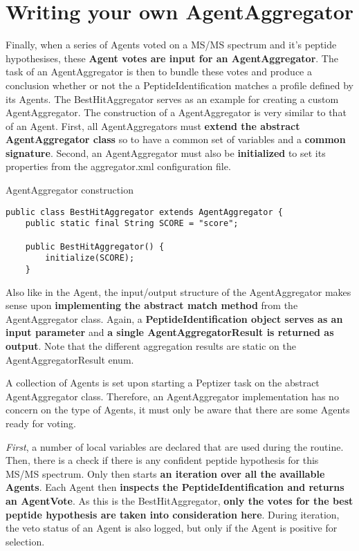 {\section{Writing your own AgentAggregator}

\npar Finally, when a series of Agents voted on a MS/MS spectrum and it's peptide hypothesises, these \textbf{Agent votes are input for an AgentAggregator}. The task of an AgentAggregator is then to bundle these votes and produce a conclusion whether or not the a PeptideIdentification matches a profile defined by its Agents.
\npar The BestHitAggregator serves as an example for creating a custom AgentAggregator. The construction of a AgentAggregator is very similar to that of an Agent. First, all AgentAggregators must \textbf{extend the abstract AgentAggregator class} so to have a common set of variables and a \textbf{common signature}. Second, an AgentAggregator must also be \textbf{initialized} to set its properties from the aggregator.xml configuration file.

%
%
\begin{algorithm}[H]
\caption{AgentAggregator construction}
\scriptsize
\vspace{0.3cm}
\begin{verbatim}
public class BestHitAggregator extends AgentAggregator {
    public static final String SCORE = "score";

    public BestHitAggregator() {
        initialize(SCORE);
    }
\end{verbatim}
\end{algorithm}
%

\npar Also like in the Agent, the input/output structure of the AgentAggregator makes sense upon \textbf{implementing the abstract match method }from the AgentAggregator class. Again, a \textbf{PeptideIdentification object serves as an input parameter }and \textbf{a single AgentAggregatorResult is returned as output}. Note that the different aggregation results are static on the AgentAggregatorResult enum.

\npar A collection of Agents is set upon starting a Peptizer task on the abstract AgentAggregator class. Therefore, an AgentAggregator implementation has no concern on the type of Agents, it must only be aware that there are some Agents ready for voting.

\npar \textit{First}, a number of local variables are declared that are used during the routine. Then, there is a check if there is any confident peptide hypothesis for this MS/MS spectrum. Only then starts \textbf{an iteration over all the availlable Agents}. Each Agent then \textbf{inspects the PeptideIdentification and returns an AgentVote}. As this is the BestHitAggregator, \textbf{only the votes for the best peptide hypothesis are taken into consideration here}. During iteration, the veto status of an Agent is also logged, but only if the Agent is positive for selection.

}
